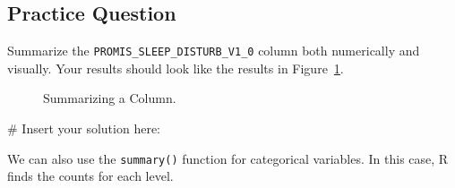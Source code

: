 \documentclass[
  letterpaper,
]{latex/krantz}
\makeatletter
\newenvironment{Shaded}{\begin{snugshade}}{\end{snugshade}}
\newcommand{\CommentTok}[1]{\textcolor[rgb]{0.37,0.37,0.37}{#1}}
\newenvironment{kframe}{%
\medskip{}
\setlength{\fboxsep}{.8em}
 \def\at@end@of@kframe{}%
 \ifinner\ifhmode%
  \def\at@end@of@kframe{\end{minipage}}%
  \begin{minipage}{\columnwidth}%
 \fi\fi%
 \def\FrameCommand##1{\hskip\@totalleftmargin \hskip-\fboxsep
 \colorbox{shadecolor}{##1}\hskip-\fboxsep
     \hskip-\linewidth \hskip-\@totalleftmargin \hskip\columnwidth}%
 \MakeFramed {\advance\hsize-\width
   \@totalleftmargin\z@ \linewidth\hsize
   \@setminipage}}%
 {\par\unskip\endMakeFramed%
 \at@end@of@kframe}
\renewenvironment{Shaded}{\begin{kframe}}{\end{kframe}}
\makeatother
\begin{document}
\subsection{Practice Question}\label{practice-question-3}

Summarize the \texttt{PROMIS\_SLEEP\_DISTURB\_V1\_0} column both
numerically and visually. Your results should look like the results in
Figure~\ref{fig-sleep-disturb-hist}.

\begin{figure}


\caption{\label{fig-sleep-disturb-hist}Summarizing a Column.}

\end{figure}%

\begin{Shaded}
\begin{Highlighting}[]
\CommentTok{\# Insert your solution here:}
\end{Highlighting}
\end{Shaded}

We can also use the \texttt{summary()} function for categorical
variables. In this case, R finds the counts for each level.
\end{document}

